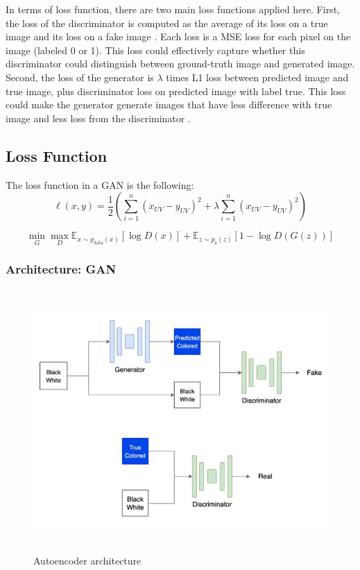 \documentclass{article}
\begin{document}
In terms of loss function, there are two main loss functions applied here. 
First, the loss of the discriminator is computed as the average of its loss on a true image and its loss on a fake image \cite{5}. 
Each loss is a MSE loss for each pixel on the image (labeled 0 or 1). 
This loss could effectively capture whether this discriminator could distinguish between ground-truth image and generated image.
Second, the loss of the generator is $\lambda$ times L1 loss between predicted image and true image, plus discriminator loss on predicted image with label true.
This loss could make the generator generate images that have less difference with true image and less loss from the discriminator \cite{6} \cite{9} \cite{10}.

\subsection{Loss Function}
The loss function in a GAN is the following:
{\Large
\begin{equation}
    \ell(x,y) = \frac{1}{2} \left( \sum_{i=1}^{n} \left( x_{UV} - y_{UV} \right)^2 + \lambda \sum_{i=1}^{n} \left( x_{UV} - y_{UV} \right)^2 \right)
\end{equation}
}

{\Large
\begin{equation}
\min_{G}\max_{D}\mathbb{E}_{x\sim p_{\text{data}}(x)}[\log{D(x)}] +  \mathbb{E}_{z\sim p_{\text{z}}(z)}[1 - \log{D(G(z))}]
\end{equation}
}

\subsubsection{Architecture: GAN}

\begin{figure}[htbp!]
    \centering
        \includegraphics[width=15cm, height=10cm]{gan.jpg}
        \caption{Autoencoder architecture}
\end{figure}
\end{document}

